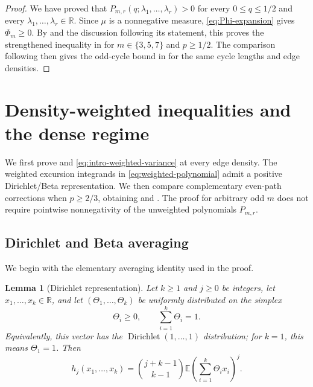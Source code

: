 \documentclass[11pt]{article}
\newtheorem{lemma}[theorem]{Lemma}
\numberwithin{equation}{section}
\newcommand{\R}{\mathbb R}
\newcommand{\E}{\mathbb E}
\begin{document}
\begin{proof}
  We have proved that
  $P_{m,r}(q;\lambda_1,\ldots,\lambda_r)>0$ for every
  $0\le q\le1/2$ and every $\lambda_1,\ldots,\lambda_r\in\R$.
  Since $\mu$ is a nonnegative measure, \eqref{eq:Phi-expansion} gives
  $\Phi_m\ge0$.
  By  and the discussion following its
  statement, this proves the strengthened inequality in
   for $m\in\{3,5,7\}$ and $p\ge1/2$.
  The comparison following  then gives the
  odd-cycle bound in  for the same cycle lengths and
  edge densities.
\end{proof}

\section{Density-weighted inequalities and the dense regime}
\label{sec:excursion-positivity}

We first prove  and
\eqref{eq:intro-weighted-variance} at every edge density.
The weighted excursion integrands in
\eqref{eq:weighted-polynomial} admit a positive Dirichlet/Beta
representation. We then compare complementary even-path corrections
when $p\ge2/3$, obtaining  and
. The proof for arbitrary odd $m$ does not require
pointwise nonnegativity of the unweighted polynomials $P_{m,r}$.

\subsection{Dirichlet and Beta averaging}
\label{sec:weighted-averaging}

We begin with the elementary averaging identity used in the proof.

\begin{lemma}[Dirichlet representation]
\label{lem:pge23-dirichlet-moment}
  Let $k\ge1$ and $j\ge0$ be integers, let
  $x_1,\ldots,x_k\in\R$, and let
  $(\Theta_1,\ldots,\Theta_k)$ be uniformly distributed on the
  simplex
  \[
    \Theta_i\ge0,\qquad \sum_{i=1}^k\Theta_i=1.
  \]
  Equivalently, this vector has the
  $\operatorname{Dirichlet}(1,\ldots,1)$ distribution; for $k=1$,
  this means $\Theta_1=1$. Then
  \begin{equation}\label{eq:pge23-dirichlet-moment}
    h_j(x_1,\ldots,x_k)
      =\binom{j+k-1}{k-1}
        \E\left(\sum_{i=1}^k\Theta_i x_i\right)^j.
  \end{equation}
\end{lemma}
\end{document}
